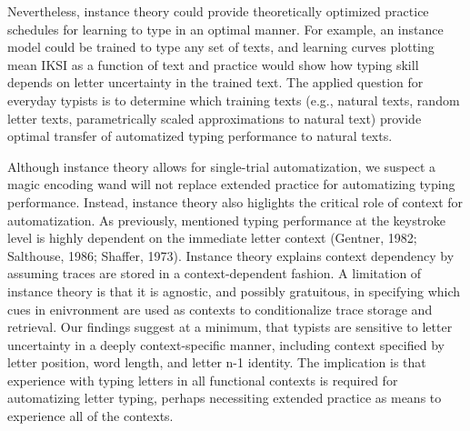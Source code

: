 \documentclass[floatsintext,man]{apa6}
\theoremstyle{definition}
\theoremstyle{definition}
\theoremstyle{definition}
\theoremstyle{remark}
\begin{document}
Nevertheless, instance theory could provide theoretically optimized
practice schedules for learning to type in an optimal manner. For
example, an instance model could be trained to type any set of texts,
and learning curves plotting mean IKSI as a function of text and
practice would show how typing skill depends on letter uncertainty in
the trained text. The applied question for everyday typists is to
determine which training texts (e.g., natural texts, random letter
texts, parametrically scaled approximations to natural text) provide
optimal transfer of automatized typing performance to natural texts.

Although instance theory allows for single-trial automatization, we
suspect a magic encoding wand will not replace extended practice for
automatizing typing performance. Instead, instance theory also higlights
the critical role of context for automatization. As previously,
mentioned typing performance at the keystroke level is highly dependent
on the immediate letter context (Gentner, 1982; Salthouse, 1986;
Shaffer, 1973). Instance theory explains context dependency by assuming
traces are stored in a context-dependent fashion. A limitation of
instance theory is that it is agnostic, and possibly gratuitous, in
specifying which cues in enivronment are used as contexts to
conditionalize trace storage and retrieval. Our findings suggest at a
minimum, that typists are sensitive to letter uncertainty in a deeply
context-specific manner, including context specified by letter position,
word length, and letter n-1 identity. The implication is that experience
with typing letters in all functional contexts is required for
automatizing letter typing, perhaps necessiting extended practice as
means to experience all of the contexts.
\end{document}
